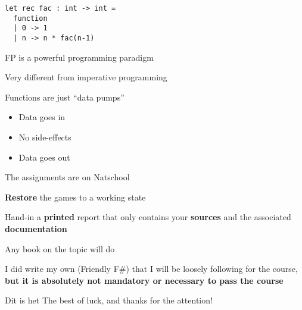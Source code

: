 \documentclass{beamer}
\begin{document}
\begin{frame}[fragile]
\begin{lstlisting}
let rec fac : int -> int = 
  function
  | 0 -> 1
  | n -> n * fac(n-1)
\end{lstlisting}
\end{frame}


\begin{slide}{
\item FP is a powerful programming paradigm
\item Very different from imperative programming
\item Functions are just ``data pumps''
\begin{itemize}
\item Data goes in
\item No side-effects
\item Data goes out
\end{itemize}
}\end{slide}

\begin{slide}{
\item The assignments are on Natschool
\item \textbf{Restore} the games to a working state
\item Hand-in a \textbf{printed} report that only contains your \textbf{sources} and the associated \textbf{documentation}
}\end{slide}

\begin{slide}{
\item Any book on the topic will do
\item I did write my own (Friendly F\#) that I will be loosely following for the course, \textbf{but it is absolutely not mandatory or necessary to pass the course}
}\end{slide}


\begin{frame}{Dit is het}
\center
\fontsize{18pt}{7.2}\selectfont
The best of luck, and thanks for the attention!
\end{frame}
\end{document}
